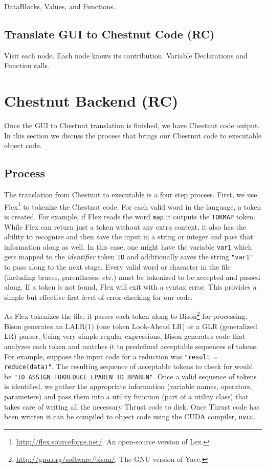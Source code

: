 \documentclass{article}
\renewcommand{\|}{\origbar} %
\newcommand{\code}[1]{\texttt{#1}}
\begin{document}
DataBlocks, Values, and Functions.

\subsection{Translate GUI to Chestnut Code (RC)}

Visit each node. Each node knows its contribution. Variable Declarations and Function calls.

\section{Chestnut Backend (RC)}

Once the GUI to Chestnut translation is finished, we have Chestnut code output. In this section we discuss the process that brings our Chestnut code to executable object code.

\subsection{Process}

The translation from Chestnut to executable is a four step process. First, we use Flex\footnote{\url{http://flex.sourceforge.net/}. An open-source version of Lex.} to tokenize the Chestnut code. For each valid word in the language, a token is created. For example, if Flex reads the word \code{map} it outputs the \code{TOKMAP} token. While Flex can return just a token without any extra context, it also has the ability to recognize and then save the input in a string or integer and pass that information along as well. In this case, one might have the variable \code{var1} which gets mapped to the {\em identifier} token \code{ID} and additionally saves the string \code{"var1"} to pass along to the next stage. Every valid word or character in the file (including braces, parentheses, etc.) must be tokenized to be accepted and passed along. If a token is not found, Flex will exit with a syntax error. This provides a simple but effective first level of error checking for our code.

As Flex tokenizes the file, it passes each token along to Bison\footnote{\url{http://gnu.org/software/bison/}. The GNU version of Yacc.} for processing. Bison generates an LALR(1) (one token Look-Ahead LR) or a GLR (generalized LR) parser. Using very simple regular expressions, Bison generates code that analyzes each token and matches it to predefined acceptable sequences of tokens. For example, suppose the input code for a reduction was \code{"result = reduce(data)"}. The resulting sequence of acceptable tokens to check for would be \code{"ID ASSIGN TOKREDUCE LPAREN ID RPAREN"}. Once a valid sequence of tokens is identified, we gather the appropriate information (variable names, operators, parameters) and pass them into a utility function (part of a utility class) that takes care of writing all the necessary Thrust code to disk. Once Thrust code has been written it can be compiled to object code using the CUDA compiler, \code{nvcc}.
\end{document}
